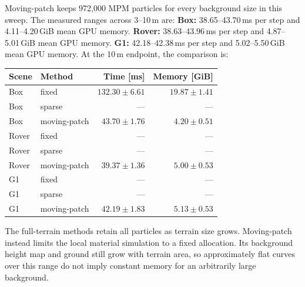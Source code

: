 Moving-patch keeps 972,000 MPM particles for every background size in this sweep. The measured ranges across 3--10\,m are:
\textbf{Box:} 38.65--43.70\,ms per step and 4.11--4.20\,GiB mean GPU memory.
\textbf{Rover:} 38.63--43.96\,ms per step and 4.87--5.01\,GiB mean GPU memory.
\textbf{G1:} 42.18--42.38\,ms per step and 5.02--5.50\,GiB mean GPU memory.
At the 10\,m endpoint, the comparison is:
\begin{center}\small\begin{tabular}{llrr}\toprule
Scene & Method & Time [ms] & Memory [GiB] \\\midrule
Box & fixed & $132.30\pm6.61$ & $19.87\pm1.41$ \\
Box & sparse & --- & --- \\
Box & moving-patch & $43.70\pm1.76$ & $4.20\pm0.51$ \\
Rover & fixed & --- & --- \\
Rover & sparse & --- & --- \\
Rover & moving-patch & $39.37\pm1.36$ & $5.00\pm0.53$ \\
G1 & fixed & --- & --- \\
G1 & sparse & --- & --- \\
G1 & moving-patch & $42.19\pm1.83$ & $5.13\pm0.53$ \\
\bottomrule\end{tabular}\end{center}
The full-terrain methods retain all particles as terrain size grows. Moving-patch instead limits the local material simulation to a fixed allocation. Its background height map and ground still grow with terrain area, so approximately flat curves over this range do not imply constant memory for an arbitrarily large background.
